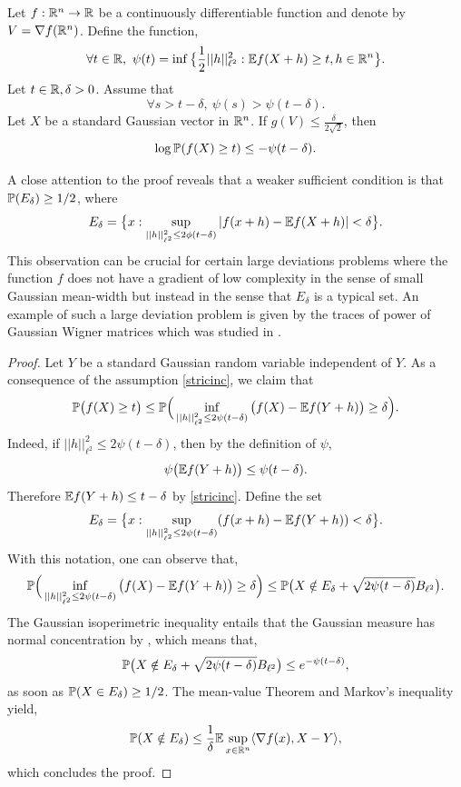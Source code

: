 \documentclass[a4paper,oneside,11pt]{article}
\begin{document}
\begin{Pro}\label{NLG}Let $f :  \mathbb{R}^n \to \mathbb{R}$ be a continuously differentiable function and denote by $V = \nabla f(\mathbb{R}^n)$. Define the function,
$$\forall t \in \mathbb{R}, \ \psi(t) = \inf \big\{ \frac{1}{2}||h||_{\ell^2}^2 : \mathbb{E} f(X+h)\geq  t, h \in \mathbb{R}^n\big \}.$$
Let $t \in \mathbb{R}, \delta>0$. Assume that 
\begin{equation} \label{stricinc} \forall s > t-\delta,\ \psi(s)> \psi(t-\delta).\end{equation}
Let $X$ be a standard Gaussian vector in $\mathbb{R}^n$. If $g(V) \leq \frac{\delta}{2\sqrt{2}}$, 
then $$\log \mathbb{P}( f(X) \geq t ) \leq -\psi(t-\delta).$$
\end{Pro}
\begin{Rem}
A close attention to the proof reveals that a weaker sufficient condition is that $\mathbb{P}(E_{\delta})\geq 1/2$, where
$$ E_{\delta}= \big\{ x : \sup_{||h||_{\ell^2}^2 \leq 2\phi(t-\delta)} | f(x+h) - \mathbb{E} f(X+h)| <\delta\big\}.$$
This observation can be crucial for certain large deviations problems where the function $f$ does not have a gradient of low complexity in the sense of small Gaussian mean-width but instead in the sense that $E_\delta$ is a typical set. An example of such a large deviation problem is given by the traces of power of Gaussian Wigner matrices which was studied in \cite{LDPtr}.

\end{Rem}
\begin{proof}Let $Y$ be a standard Gaussian random variable independent of $Y$. As a consequence of the assumption \eqref{stricinc}, we claim that
\begin{equation} \label{bound} \mathbb{P}\big( f(X) \geq t \big) \leq \mathbb{P}\Big( \inf_{ || h||_{\ell^2}^2 \leq 2 \psi(t-\delta)}\big( f(X) - \mathbb{E} f(Y+h) \big)\geq\delta \Big).\end{equation}
Indeed, if $||h||_{\ell^2}^2 \leq 2 \psi(t-\delta)$, then by the definition of $\psi$, 
$$ \psi\big( \mathbb{E} f(Y+h) \big) \leq \psi(t-\delta).$$
Therefore $\mathbb{E} f(Y+h) \leq t-\delta$ by \eqref{stricinc}. Define the set
$$ E_{\delta}= \big\{ x : \sup_{||h||_{\ell^2}^2 \leq 2\psi(t-\delta)} (f(x+h) - \mathbb{E} f(Y+h))<\delta\big\}.$$
With this notation, one can observe that,
$$ \mathbb{P}\Big( \inf_{ || h||_{\ell^2}^2 \leq 2 \psi(t-\delta)} \big( f(X) - \mathbb{E} f(Y+h)\big) \geq\delta \Big) \leq \mathbb{P}\big( X \notin E_{\delta} + \sqrt{2\psi(t-\delta)} B_{\ell^2}\big).$$
The Gaussian isoperimetric inequality entails that the Gaussian measure has normal concentration by \cite[Corollary 2.6]{Ledouxmono}, which means that,
$$\mathbb{P}\big( X \notin E_{\delta} + \sqrt{2\psi(t-\delta)} B_{\ell^2}\big) \leq e^{-\psi(t-\delta)},$$
as soon as $\mathbb{P}(X \in  E_\delta) \geq 1/2$. The mean-value Theorem and Markov's inequality yield,
$$ \mathbb{P}(X \notin  E_\delta) \leq \frac{1}{\delta} \mathbb{E}   \sup_{x \in \mathbb{R}^n} \langle \nabla f(x), X-Y\rangle,$$
which concludes the proof.
\end{proof}
\end{document}
